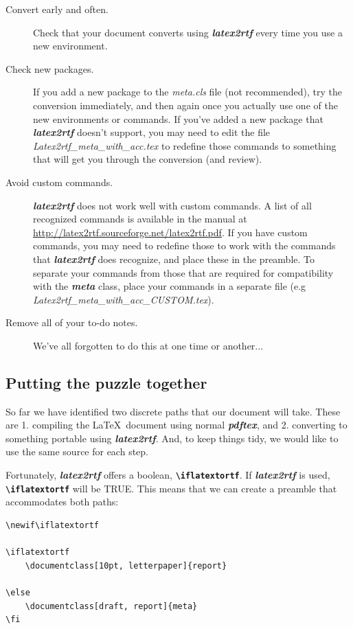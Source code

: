 \documentclass[12pt,letterpaper]{article}
\newcommand{\fn}[1]{\emph{#1}}
\newcommand{\packagename}[1]{\textbf{\emph{#1}}}
\newcommand{\envname}[1]{\textbf{\texttt{#1}}}
\begin{document}
\begin{description}
\item[Convert early and often.] Check that your document converts using \packagename{latex2rtf} every time you use  a new environment.
\item[Check new packages.]  If you add a new package to the \fn{meta.cls} file (not recommended), try the conversion immediately, and then again once you actually use one of the new environments or commands. If you've added a new package that \packagename{latex2rtf} doesn't support, you may need to edit the file \fn{Latex2rtf\_meta\_with\_acc.tex} to redefine those commands to something that will get you through the conversion (and review).
\item[Avoid custom commands.] \packagename{latex2rtf} does not work well with custom commands. A list of all recognized commands is available in the manual at \url{http://latex2rtf.sourceforge.net/latex2rtf.pdf}. If you have custom commands, you may need to redefine those to work with the commands that \packagename{latex2rtf} does recognize, and place these in the preamble. To separate your commands from those that are required for compatibility with the \packagename{meta} class, place your commands in a separate file (e.g \fn{Latex2rtf\_meta\_with\_acc\_CUSTOM.tex}).
\item[Remove all of your to-do notes.] We've all forgotten to do this at one time or another...
\end{description}

\subsection{Putting the puzzle together}
So far we have identified two discrete paths that our document will take. These are 1. compiling the \LaTeX\ document using normal \packagename{pdftex}, and 2. converting to something portable using \packagename{latex2rtf}. And, to keep things tidy, we would like to use the same source for each step. 

Fortunately, \packagename{latex2rtf} offers a boolean, \envname{\textbackslash iflatextortf}. If \packagename{latex2rtf} is used, \envname{\textbackslash iflatextortf} will be TRUE. This means that we can create a preamble that accommodates both paths:

\begin{verbatim}
\newif\iflatextortf

\iflatextortf
    \documentclass[10pt, letterpaper]{report}
    
\else
    \documentclass[draft, report]{meta} 
\fi
\end{verbatim}
\end{document}
